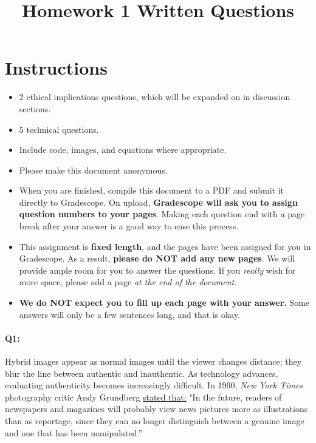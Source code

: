 \date{}

\title{\vspace{-1cm}Homework 1 Written Questions}



\maketitle
\vspace{-3cm}
\thispagestyle{fancy}

\section*{Instructions}
\begin{itemize}
  \item 2 ethical implications questions, which will be expanded on in discussion sections.
  \item 5 technical questions.
  \item Include code, images, and equations where appropriate.
  \item Please make this document anonymous.
  \item When you are finished, compile this document to a PDF and submit it directly to Gradescope. On upload, \textbf{Gradescope will ask you to assign question numbers to your pages}. Making each question end with a page break after your answer is a good way to ease this process.
  \item This assignment is \textbf{fixed length}, and the pages have been assigned for you in Gradescope. As a result, \textbf{please do NOT add any new pages}. We will provide ample room for you to answer the questions. If you \emph{really} wish for more space, please add a page \emph{at the end of the document}.
  \item \textbf{We do NOT expect you to fill up each page with your answer.} Some answers will only be a few sentences long, and that is okay.
\end{itemize}
\pagebreak

\paragraph{Q1:} Hybrid images appear as normal images until the viewer changes distance; they blur the line between authentic and inauthentic. As technology advances, evaluating authenticity becomes increasingly difficult. In 1990, \emph{New York Times} photography critic Andy Grundberg \href{https://www.nytimes.com/1990/08/12/arts/photography-view-ask-it-no-questions-the-camera-can-lie.html}{stated that:} "In the future, readers of newspapers and magazines will probably view news pictures more as illustrations than as reportage, since they can no longer distinguish between a genuine image and one that has been manipulated.''

